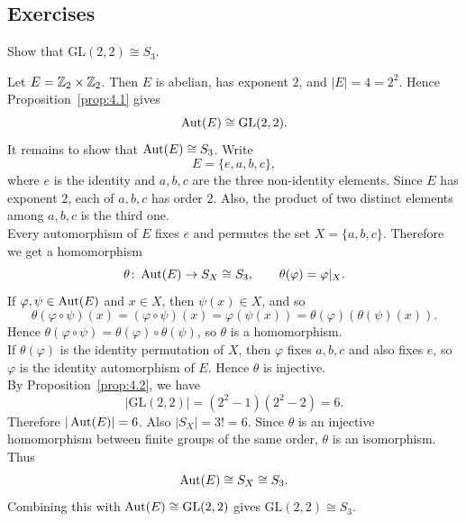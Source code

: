 \documentclass[../Odyssey_Project.tex]{subfiles}
\begin{document}
\subsection*{Exercises}

\begin{exercise}
\label{ex:4.1}
Show that $\mathrm{GL}(2, 2) \cong S_3$.
\end{exercise}
\begin{solution}
Let $E=\mathbb{Z}_2\times \mathbb{Z}_2$. Then $E$ is abelian, has exponent $2$, and $|E|=4=2^2$. Hence Proposition~\ref{prop:4.1} gives
\[
    \operatorname{Aut}(E)\cong \mathrm{GL}(2,2).
\]
It remains to show that $\operatorname{Aut}(E)\cong S_3$. Write
\[
    E=\{e,a,b,c\},
\]
where $e$ is the identity and $a,b,c$ are the three non-identity elements. Since $E$ has exponent $2$, each of $a,b,c$ has order $2$. Also, the product of two distinct elements among $a,b,c$ is the third one.\\
Every automorphism of $E$ fixes $e$ and permutes the set $X=\{a,b,c\}$. Therefore we get a homomorphism
\[
    \theta \colon \operatorname{Aut}(E)\to S_X\cong S_3,
    \qquad
    \theta(\varphi)=\varphi|_X.
\]
If $\varphi,\psi\in \operatorname{Aut}(E)$ and $x\in X$, then $\psi(x)\in X$, and so
\[
    \theta(\varphi\circ\psi)(x)
    =(\varphi\circ\psi)(x)
    =\varphi(\psi(x))
    =\theta(\varphi)(\theta(\psi)(x)).
\]
Hence $\theta(\varphi\circ\psi)=\theta(\varphi)\circ\theta(\psi)$, so $\theta$ is a homomorphism.\\
If $\theta(\varphi)$ is the identity permutation of $X$, then $\varphi$ fixes $a,b,c$ and also fixes $e$, so $\varphi$ is the identity automorphism of $E$. Hence $\theta$ is injective.\\
By Proposition~\ref{prop:4.2}, we have
\[
    |\mathrm{GL}(2,2)|=(2^2-1)(2^2-2)=6.
\]
Therefore $|\operatorname{Aut}(E)|=6$. Also $|S_X|=3!=6$. Since $\theta$ is an injective homomorphism between finite groups of the same order, $\theta$ is an isomorphism. Thus
\[
    \operatorname{Aut}(E)\cong S_X\cong S_3.
\]
Combining this with $\operatorname{Aut}(E)\cong \mathrm{GL}(2,2)$ gives $\mathrm{GL}(2,2)\cong S_3$.
\end{solution}
\end{document}

